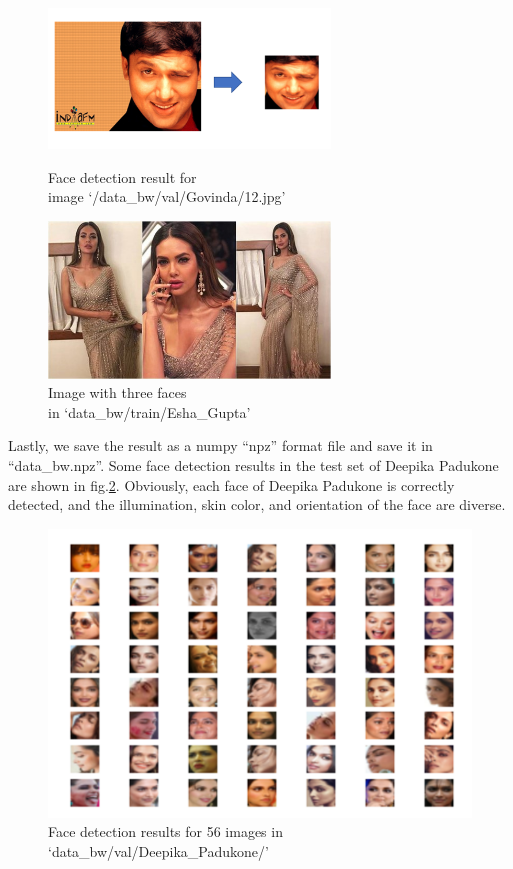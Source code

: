 \begin{figure}[H]
    \begin{minipage}[t]{0.47\textwidth}
        \centering\includegraphics[width=7.5cm]{./figures/mtcnn2.png}
        \caption{Face detection result for\\ image ‘/data\_bw/val/Govinda/12.jpg'}
        \label{pic:mtcnn2}
    \end{minipage}
    \qquad
    \begin{minipage}[t]{0.47\textwidth}
        \centering\includegraphics[width=7.5cm]{./figures/mtcnn3.jpg}
        \caption{Image with three faces\\ in ‘data\_bw/train/Esha\_Gupta'}
        \label{pic:mtcnn3}
    \end{minipage}
\end{figure}

Lastly, we save the result as a numpy ``npz'' format file and save it in ``data\_bw.npz''. Some face detection results in the test set of Deepika Padukone are shown in fig.\ref{pic:mtcnn4}. Obviously, each face of Deepika Padukone is correctly detected, and the illumination, skin color, and orientation of the face are diverse.

\begin{figure}[H]
    \centering\includegraphics[width=12cm]{./figures/mtcnn4.png}
    \caption{Face detection results for 56 images in ‘data\_bw/val/Deepika\_Padukone/'}
    \label{pic:mtcnn4}
\end{figure}

